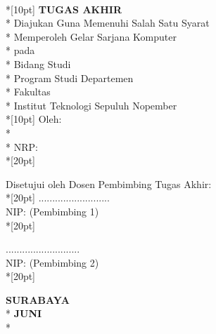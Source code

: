 \newpage
	\thispagestyle{plain}		
		\begin{centering}
			\textbf{\MakeUppercase{\judul}} \\*[10pt]
			\textbf{\large{TUGAS AKHIR}} \\*
			Diajukan Guna Memenuhi Salah Satu Syarat \\*
			Memperoleh Gelar Sarjana Komputer \\*
			pada \\*
			Bidang Studi \bidangStudi \\*
			Program Studi \prodi Departemen \jurusan \\*
			Fakultas \fakultas \\*
			Institut Teknologi Sepuluh Nopember \\*[10pt]
			Oleh: \\*
			\textbf{\penulis} \\*
			NRP: \nrp \\*[20pt]
		\end{centering}
	
		{\noindent Disetujui oleh Dosen Pembimbing Tugas Akhir:}\\*[20pt]         \pembimbingSatu \hfill \hfill .......................... \\
			NIP: \nipPembimbingSatu \hfill \hfill (Pembimbing 1) \\*[20pt]
			
		{\noindent \pembimbingDua  \hfill \hfill ...........................}  \\
		NIP: \nipPembimbingDua \hfill \hfill (Pembimbing 2) \\*[20pt] 
	
		\begin{centering}
			\textbf{SURABAYA} \\*
			\textbf{JUNI \tahun} \\*
		\end{centering}
		\cleardoublepage